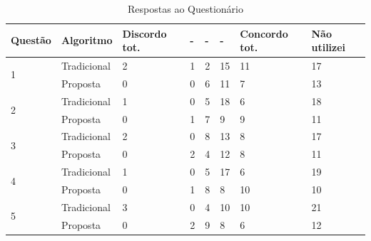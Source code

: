\begin{table}[h]
\footnotesize
\caption{Respostas ao Questionário}
\label{tab:questionario-satisfacao-respostas}
\centering
\begin{tabular}{|p{1.5cm}|p{1.8cm}|p{2.2cm}|p{0.6cm}|p{0.6cm}|p{0.6cm}|p{2.3cm}|p{2cm}|}
\hline
\textbf{Questão} & \textbf{Algoritmo}   & \textbf{Discordo tot.} & \textbf{-} & \textbf{-} & \textbf{-} & \textbf{Concordo tot.} & \textbf{Não utilizei} \\
\hline
\multirow{2}{*}{1}          & Tradicional & 2                   & 1                     & 2                         & 15                    & 11                  & 17           \\
                            & Proposta    & 0                   & 0                     & 6                         & 11                    & 7                   & 13           \\
\hline
\multirow{2}{*}{2}          & Tradicional & 1                   & 0                     & 5                         & 18                    & 6                   & 18           \\
                            & Proposta    & 0                   & 1                     & 7                         & 9                     & 9                   & 11           \\
\hline
\multirow{2}{*}{3}          & Tradicional & 2                   & 0                     & 8                         & 13                    & 8                   & 17           \\
                            & Proposta    & 0                   & 2                     & 4                         & 12                    & 8                   & 11           \\
\hline
\multirow{2}{*}{4}          & Tradicional & 1                   & 0                     & 5                         & 17                    & 6                   & 19           \\
                            & Proposta    & 0                   & 1                     & 8                         & 8                     & 10                  & 10           \\
\hline
\multirow{2}{*}{5}          & Tradicional & 3                   & 0                     & 4                         & 10                    & 10                  & 21           \\
                            & Proposta    & 0                   & 2                     & 9                         & 8                     & 6                   & 12           \\

\end{tabular}
\end{table}
